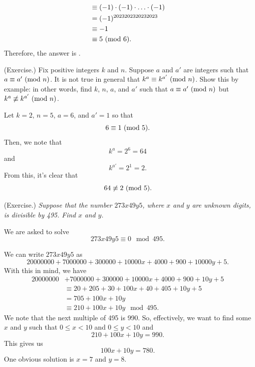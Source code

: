 \documentclass[letterpaper]{article}
\begin{document}
\begin{mdframed}
\begin{itemize}
\begin{mdframed}
\begin{equation*}
\begin{aligned}
                        &\equiv (-1) \cdot (-1) \cdot \hdots \cdot (-1) \\ 
                        &= (-1)^{2023202320232023} \\ 
                        &\equiv -1 \\ 
                        &\equiv 5 \ (\mathrm{mod}\ 6).
                \end{aligned}
            \end{equation*}
            Therefore, the answer is .
        \end{mdframed}
    \end{itemize}
\end{mdframed}

\begin{mdframed}
    (Exercise.) Fix positive integers $k$ and $n$. Suppose $a$ and $a'$ are integers such that $a \equiv a' \ (\mathrm{mod}\ n)$. It is not true in general that $k^a \equiv k^{a'} \ (\mathrm{mod}\ n)$. Show this by example: in other words, find $k$, $n$, $a$, and $a'$ such that $a \equiv a' \ (\mathrm{mod}\ n)$ but $k^a \not\equiv k^{a'} \ (\mathrm{mod}\ n)$. 

    \begin{mdframed}
        Let $k = 2$, $n = 5$, $a = 6$, and $a' = 1$ so that 
        \[6 \equiv 1 \ (\mathrm{mod}\ 5).\]
        Then, we note that 
        \[k^a = 2^6 = 64\]
        and 
        \[k^{a'} = 2^1 = 2.\]
        From this, it's clear that 
        \[64 \not\equiv 2 \ (\mathrm{mod}\ 5).\]
    \end{mdframed}
\end{mdframed}

\begin{mdframed}[nobreak=true]
    (Exercise.) \emph{Suppose that the number $273x49y5$, where $x$ and $y$ are unknown digits, is divisible by 495. Find $x$ and $y$.}
    \begin{mdframed}
        We are asked to solve 
        \[273x49y5 \equiv 0 \mod{495}.\]

        We can write $273x49y5$ as 
        \[20000000 + 7000000 + 300000 + 10000x + 4000 + 900 + 10000y + 5.\]
        With this in mind, we have
        \begin{equation*}
            \begin{aligned}
                20000000 &+ 7000000 + 300000 + 10000x + 4000 + 900 + 10y + 5 \\ 
                    &\equiv 20 + 205 + 30 + 100x + 40 + 405 + 10y + 5 \\ 
                    &= 705 + 100x + 10y \\ 
                    &\equiv 210 + 100x + 10y \mod{495}.
            \end{aligned}
        \end{equation*}
        We note that the next multiple of 495 is 990. So, effectively, we want to find some $x$ and $y$ such that $0 \leq x < 10$ and $0 \leq y < 10$ and
        \[210 + 100x + 10y = 990.\]
        This gives us 
        \[100x + 10y = 780.\]
        One obvious solution is $x = 7$ and $y = 8$. 
    \end{mdframed}
\end{mdframed}
\end{document}
